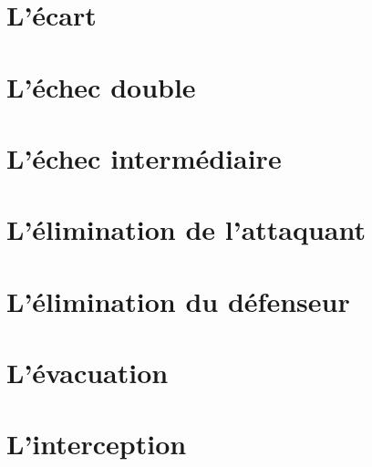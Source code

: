 \documentclass[a5paper,openany,twocolumn]{book}
\begin{document}
{\lipsum[4]

\chapter{L'écart}

\lipsum[4]

\chapter{L'échec double}

\lipsum[4]
\chapter{L'échec intermédiaire}

\lipsum[4]
\chapter{L'élimination de l'attaquant}

\lipsum[4]

\chapter{L'élimination du défenseur}


\lipsum[4]
\chapter{L'évacuation}

\lipsum[4]

\chapter{L'interception}
\lipsum[4]

}
\end{document}
